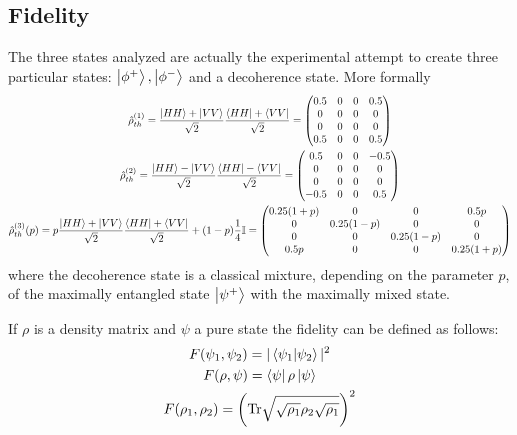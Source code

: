 \documentclass[a4paper, 11pt]{article}
\begin{document}
      \subsection{Fidelity}
        The three states analyzed are actually the experimental attempt to create three particular states: $\ket{\phi^+}, \ket{\phi^-}$ and a decoherence state. More formally
        \begin{gather*}
          \hat{\rho}^{(1)}_{th} = \frac{\ket{HH} + \ket{VV}}{\sqrt{2}}\frac{\bra{HH} + \bra{VV}}{\sqrt{2}} =
          \begin{pmatrix}
            0.5 & 0 & 0 & 0.5 \\
            0 & 0 & 0 & 0 \\
            0 & 0 & 0 & 0 \\
            0.5 & 0 & 0 & 0.5
          \end{pmatrix} \\
          \hat{\rho}^{(2)}_{th} = \frac{\ket{HH} - \ket{VV}}{\sqrt{2}}\frac{\bra{HH} - \bra{VV}}{\sqrt{2}} =
          \begin{pmatrix}
            0.5 & 0 & 0 & -0.5 \\
            0 & 0 & 0 & 0 \\
            0 & 0 & 0 & 0 \\
            -0.5 & 0 & 0 & 0.5
          \end{pmatrix} \\
          \hat{\rho}^{(3)}_{th}(p) = p\frac{\ket{HH} + \ket{VV}}{\sqrt{2}}\frac{\bra{HH} + \bra{VV}}{\sqrt{2}} + (1 - p)\frac{1}{4}\mathbb{I} =
          \begin{pmatrix}
            0.25(1+p) & 0 & 0 & 0.5p \\
            0 & 0.25(1-p) & 0 & 0 \\
            0 & 0 & 0.25(1-p) & 0 \\
            0.5p & 0 & 0 & 0.25(1+p)
          \end{pmatrix}
        \end{gather*}
        where the decoherence state is a classical mixture, depending on the parameter $p$, of the maximally entangled state $\ket{\psi^+}$ with the maximally mixed state.

        If $\rho$ is a density matrix and $\psi$ a pure state the fidelity can be defined as follows:
        \begin{gather*}
          F(\psi_1, \psi_2) = |\braket{\psi_1}{\psi_2}|^2 \\
          F(\rho,\psi) = \bra{\psi}\rho\ket{\psi} \\
          F(\rho_1,\rho_2) = \left(\text{Tr}\sqrt{\sqrt{\rho_1}\rho_2\sqrt{\rho_1}} \right)^2
        \end{gather*}
\end{document}
